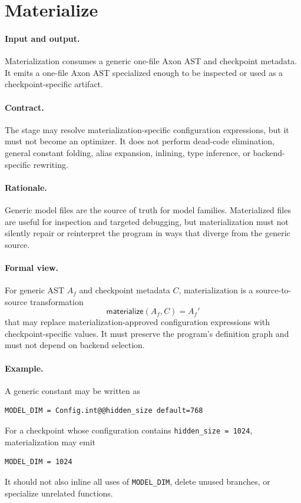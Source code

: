 \section{Materialize}

\paragraph{Input and output.}
Materialization consumes a generic one-file Axon AST and checkpoint metadata.
It emits a one-file Axon AST specialized enough to be inspected or used as a
checkpoint-specific artifact.

\paragraph{Contract.}
The stage may resolve materialization-specific configuration expressions, but
it must not become an optimizer.  It does not perform dead-code elimination,
general constant folding, alias expansion, inlining, type inference, or
backend-specific rewriting.

\paragraph{Rationale.}
Generic model files are the source of truth for model families.  Materialized
files are useful for inspection and targeted debugging, but materialization
must not silently repair or reinterpret the program in ways that diverge from
the generic source.

\paragraph{Formal view.}
For generic AST \(A_f\) and checkpoint metadata \(C\), materialization is a
source-to-source transformation
\[
  \mathsf{materialize}(A_f,C) = A_f'
\]
that may replace materialization-approved configuration expressions with
checkpoint-specific values.  It must preserve the program's definition graph
and must not depend on backend selection.

\paragraph{Example.}
A generic constant may be written as
\begin{verbatim}
MODEL_DIM = Config.int@@hidden_size default=768
\end{verbatim}
For a checkpoint whose configuration contains \verb|hidden_size = 1024|,
materialization may emit
\begin{verbatim}
MODEL_DIM = 1024
\end{verbatim}
It should not also inline all uses of \verb|MODEL_DIM|, delete unused branches,
or specialize unrelated functions.
